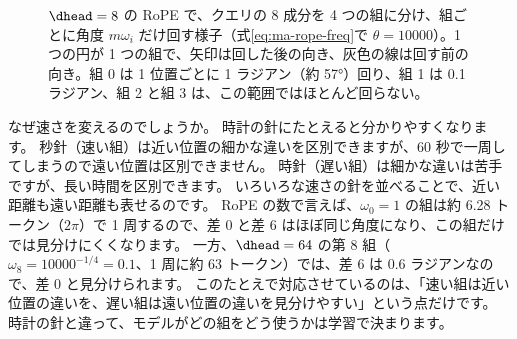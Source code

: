 \begin{figure}[tbp]
\centering
{}
\caption{$\dhead=8$ の RoPE で、クエリの 8 成分を 4 つの組に分け、組ごとに角度 $m\omega_i$ だけ回す様子（式\eqref{eq:ma-rope-freq}で $\theta=10000$）。1 つの円が 1 つの組で、矢印は回した後の向き、灰色の線は回す前の向き。組 0 は 1 位置ごとに 1 ラジアン（約 57°）回り、組 1 は 0.1 ラジアン、組 2 と組 3 は、この範囲ではほとんど回らない。}
\label{fig:ma-rope-pairs}
\end{figure}

なぜ速さを変えるのでしょうか。
時計の針にたとえると分かりやすくなります。
秒針（速い組）は近い位置の細かな違いを区別できますが、60 秒で一周してしまうので遠い位置は区別できません。
時針（遅い組）は細かな違いは苦手ですが、長い時間を区別できます。
いろいろな速さの針を並べることで、近い距離も遠い距離も表せるのです。
RoPE の数で言えば、$\omega_0=1$ の組は約 6.28 トークン（$2\pi$）で 1 周するので、差 0 と差 6 はほぼ同じ角度になり、この組だけでは見分けにくくなります。
一方、$\dhead=64$ の第 8 組（$\omega_8=10000^{-1/4}=0.1$、1 周に約 63 トークン）では、差 6 は 0.6 ラジアンなので、差 0 と見分けられます。
このたとえで対応させているのは、「速い組は近い位置の違いを、遅い組は遠い位置の違いを見分けやすい」という点だけです。
時計の針と違って、モデルがどの組をどう使うかは学習で決まります。

